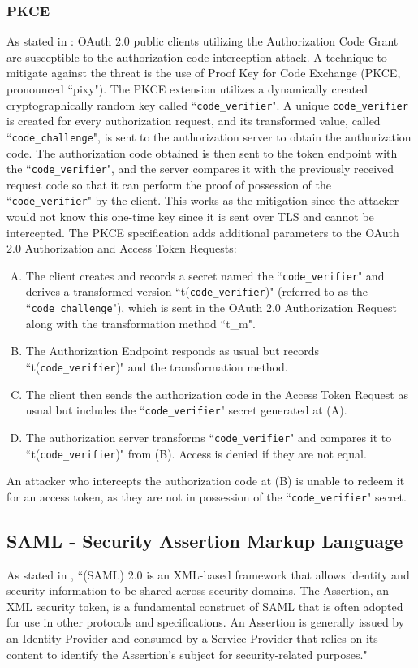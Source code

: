 \subsubsection{PKCE}
As stated in \cite{pkce_downgrade}: OAuth 2.0 public clients utilizing the Authorization Code Grant are susceptible to the authorization code interception attack. A technique to mitigate against the threat is the use of Proof Key for Code Exchange (PKCE, pronounced ``pixy"). The PKCE extension utilizes a dynamically created cryptographically random key called ``\texttt{code\_verifier}".  A unique \texttt{code\_verifier} is created for every authorization request, and its transformed value, called ``\texttt{code\_challenge}", is sent to the authorization server to obtain the authorization code.  The authorization code obtained is then sent to the token endpoint with the ``\texttt{code\_verifier}", and the server compares it with the previously received request code so that it can perform the proof of possession of the ``\texttt{code\_verifier}" by the client.  This works as the mitigation since the attacker would not know this one-time key since it is sent over TLS and cannot be intercepted.
The PKCE specification adds additional parameters to the OAuth 2.0 Authorization and Access Token Requests:
\begin{enumerate}[(A)]
    \item The client creates and records a secret named the ``\texttt{code\_verifier}" and derives a transformed version ``t(\texttt{code\_verifier})" (referred to as the ``\texttt{code\_challenge}"), which is sent in the OAuth 2.0 Authorization Request along with the transformation method ``t\_m". 
    \item The Authorization Endpoint responds as usual but records ``t(\texttt{code\_verifier})" and the transformation method. 
    \item The client then sends the authorization code in the Access Token Request as usual but includes the ``\texttt{code\_verifier}" secret generated at (A). 
    \item The authorization server transforms ``\texttt{code\_verifier}" and compares it to ``t(\texttt{code\_verifier})" from (B).  Access is denied if they are not equal.
\end{enumerate}
An attacker who intercepts the authorization code at (B) is unable to redeem it for an access token, as they are not in possession of the ``\texttt{code\_verifier}" secret.

\subsection{SAML - Security Assertion Markup Language}
As stated in \cite{ietf_SAML}, ``(\Gls{SAML}) 2.0 is an XML-based framework that allows identity and security information to be shared across security domains. The Assertion, an XML security token, is a fundamental construct of \Gls{SAML} that is often adopted for use in other protocols and specifications. An Assertion is generally issued by an Identity Provider and consumed by a Service Provider that relies on its content to identify the Assertion's subject for security-related purposes."





